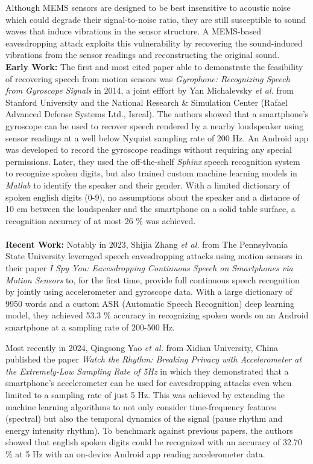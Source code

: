\documentclass[sigconf, nonacm]{acmart}
\begin{document}
Although MEMS sensors are designed to be best insensitive to acoustic noise which could degrade their signal-to-noise ratio, they are still susceptible to sound waves that induce vibrations in the sensor structure.
A MEMS-based eavesdropping attack exploits this vulnerability by recovering the sound-induced vibrations from the sensor readings and reconstructing the original sound.
\\[6pt]
\textbf{Early Work:} The first and most cited paper able to demonstrate the feasibility of recovering speech from motion sensors was \textit{Gyrophone: Recognizing Speech from Gyroscope Signals} \cite{Gyrophone2014} in 2014, a joint efffort by Yan Michalevsky \textit{et al.} from Stanford University and the National Research \& Simulation Center (Rafael Advanced Defense Systems Ltd., Isreal).
The authors showed that a smartphone's gyroscope can be used to recover speech rendered by a nearby loudspeaker using sensor readings at a well below Nyquist sampling rate of 200 Hz.
An Android app was developed to record the gyroscope readings without requiring any special permissions.
Later, they used the off-the-shelf \textit{Sphinx} speech recognition system to recognize spoken digits, but also trained custom machine learning models in \textit{Matlab} to identify the speaker and their gender.
With a limited dictionary of spoken english digits (0-9), no assumptions about the speaker and a distance of 10 cm between the loudspeaker and the smartphone on a solid table surface, a recognition accuracy of at most 26 \% was achieved.
\\~\\
\textbf{Recent Work:} Notably in 2023, Shijia Zhang \textit{et al.} from The Pennsylvania State University leveraged speech eavesdropping attacks using motion sensors in their paper \textit{I Spy You: Eavesdropping Continuous Speech on Smartphones via Motion Sensors} \cite{ISpyU2023} to, for the first time, provide full continuous speech recognition by jointly using accelerometer and gyroscope data.
With a large dictionary of 9950 words and a custom ASR (Automatic Speech Recognition) deep learning model, they achieved 53.3 \% accuracy in recognizing spoken words on an Android smartphone at a sampling rate of 200-500 Hz.

Most recently in 2024, Qingsong Yao \textit{et al.} from Xidian University, China published the paper \textit{Watch the Rhythm: Breaking Privacy with Accelerometer at the Extremely-Low Sampling Rate of 5Hz} \cite{WatchTheRhythm2024} in which they demonstrated that a smartphone's accelerometer can be used for eavesdropping attacks even when limited to a sampling rate of just 5 Hz.
This was achieved by extending the machine learning algorithms to not only consider time-frequency features (spectral) but also the temporal dynamics of the signal (pause rhythm and energy intensity rhythm).
To benchmark against previous papers, the authors showed that english spoken digits could be recognized with an accuracy of 32.70 \% at 5 Hz with an on-device Android app reading accelerometer data.
\end{document}
